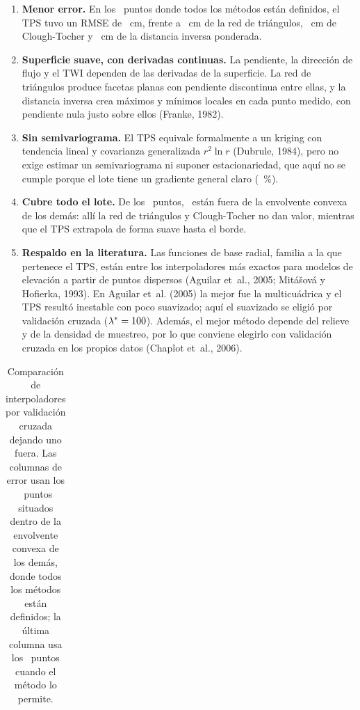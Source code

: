 \documentclass[10pt]{article}
\begin{document}
\begin{enumerate}
  \item \textbf{Menor error.} En los \NHull\ puntos donde todos los métodos están definidos, el TPS tuvo un RMSE de
  \RMSETPSHull~cm, frente a \RMSETINHull~cm de la red de triángulos, \RMSECTHull~cm de Clough-Tocher y \RMSEIDWHull~cm
  de la distancia inversa ponderada.
  \item \textbf{Superficie suave, con derivadas continuas.} La pendiente, la dirección de flujo y el TWI dependen de las
  derivadas de la superficie. La red de triángulos produce facetas planas con pendiente discontinua entre ellas, y la
  distancia inversa crea máximos y mínimos locales en cada punto medido, con pendiente nula justo sobre ellos
  (Franke, 1982).
  \item \textbf{Sin semivariograma.} El TPS equivale formalmente a un kriging con tendencia lineal y covarianza
  generalizada \(r^2\ln r\) (Dubrule, 1984), pero no exige estimar un semivariograma ni suponer estacionariedad, que aquí
  no se cumple porque el lote tiene un gradiente general claro (\GradPlano~\%).
  \item \textbf{Cubre todo el lote.} De los \NPuntos\ puntos, \NFuera\ están fuera de la envolvente convexa de los
  demás: allí la red de triángulos y Clough-Tocher no dan valor, mientras que el TPS extrapola de forma suave hasta
  el borde.
  \item \textbf{Respaldo en la literatura.} Las funciones de base radial, familia a la que pertenece el TPS, están
  entre los interpoladores más exactos para modelos de elevación a partir de puntos dispersos (Aguilar et~al., 2005;
  Mitášová y Hofierka, 1993). En Aguilar et~al. (2005) la mejor fue la multicuádrica y el TPS resultó inestable con
  poco suavizado; aquí el suavizado se eligió por validación cruzada (\(\lambda^{*} = 100\)). Además, el mejor
  método depende del relieve y de la densidad de muestreo, por lo que conviene elegirlo con validación cruzada en los
  propios datos (Chaplot et~al., 2006).
\end{enumerate}

\begin{table}[H]
\caption{Comparación de interpoladores por validación cruzada dejando uno fuera. Las columnas de error usan los
\NHull\ puntos situados dentro de la envolvente convexa de los demás, donde todos los métodos están definidos; la
última columna usa los \NPuntos\ puntos cuando el método lo permite.}
\label{tab:interp}
\tnum
\begin{tabularx}{\linewidth}{@{}Yrrrrr@{}}
\toprule
{} &  &  &  &  &  \\ \midrule

\end{tabularx}
\end{table}
\end{document}
